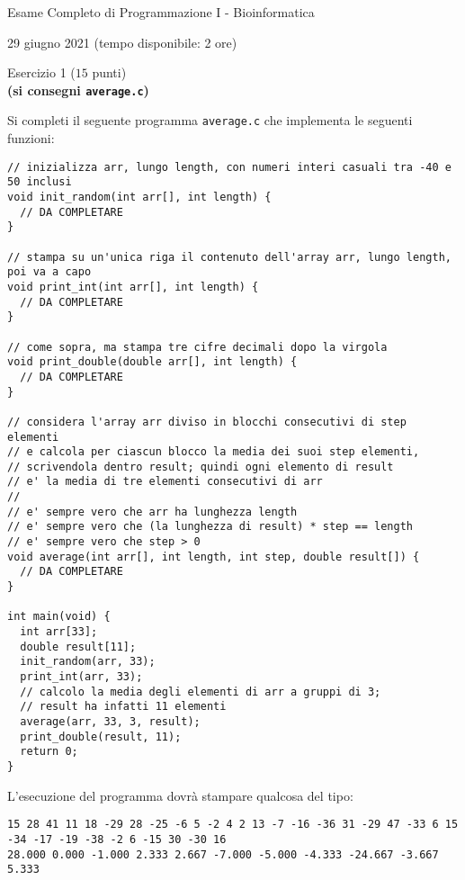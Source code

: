 \documentclass[12pt]{article}
\begin{document}
\begin{center}{\LARGE Esame Completo di Programmazione I - Bioinformatica}\\
\begin{center}
  \large 29 giugno 2021 (tempo disponibile: 2 ore)
\end{center}
\end{center}

\vspace*{1ex}
\begin{center}{\Large Esercizio 1} ($15$ punti)\\
  \textbf{(si consegni \texttt{average.c})}
\end{center}
Si completi il seguente programma \texttt{average.c} che implementa le seguenti funzioni:

\begin{center}
\begin{lstlisting}[language=myC]
// inizializza arr, lungo length, con numeri interi casuali tra -40 e 50 inclusi
void init_random(int arr[], int length) {
  // DA COMPLETARE
}

// stampa su un'unica riga il contenuto dell'array arr, lungo length, poi va a capo
void print_int(int arr[], int length) {
  // DA COMPLETARE
}

// come sopra, ma stampa tre cifre decimali dopo la virgola
void print_double(double arr[], int length) {
  // DA COMPLETARE
}

// considera l'array arr diviso in blocchi consecutivi di step elementi
// e calcola per ciascun blocco la media dei suoi step elementi,
// scrivendola dentro result; quindi ogni elemento di result
// e' la media di tre elementi consecutivi di arr
//
// e' sempre vero che arr ha lunghezza length
// e' sempre vero che (la lunghezza di result) * step == length
// e' sempre vero che step > 0
void average(int arr[], int length, int step, double result[]) {
  // DA COMPLETARE
}

int main(void) {
  int arr[33];
  double result[11];
  init_random(arr, 33);
  print_int(arr, 33);
  // calcolo la media degli elementi di arr a gruppi di 3;
  // result ha infatti 11 elementi
  average(arr, 33, 3, result);
  print_double(result, 11);
  return 0;
}
\end{lstlisting}
\end{center}

\noindent
L'esecuzione del programma dovr\`a stampare qualcosa del tipo:

\begin{mdframed}[backgroundcolor=lightgrey] 
{\scriptsize\begin{verbatim}
15 28 41 11 18 -29 28 -25 -6 5 -2 4 2 13 -7 -16 -36 31 -29 47 -33 6 15 -34 -17 -19 -38 -2 6 -15 30 -30 16 
28.000 0.000 -1.000 2.333 2.667 -7.000 -5.000 -4.333 -24.667 -3.667 5.333 
\end{verbatim}}
\end{mdframed}
\end{document}
